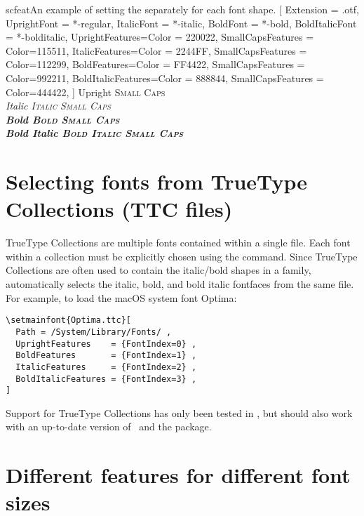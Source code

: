 \documentclass[a4paper]{l3doc}
\begin{document}
\begin{Xexample}{scfeat}{An example of setting the 
separately for each font shape.}
  [
      Extension = {.otf},
      UprightFont = {*-regular}, ItalicFont = {*-italic},
      BoldFont = {*-bold}, BoldItalicFont = {*-bolditalic},
      UprightFeatures={Color = 220022,
           SmallCapsFeatures = {Color=115511}},
       ItalicFeatures={Color = 2244FF,
           SmallCapsFeatures = {Color=112299}},
         BoldFeatures={Color = FF4422,
           SmallCapsFeatures = {Color=992211}},
   BoldItalicFeatures={Color = 888844,
           SmallCapsFeatures = {Color=444422}},
           ]
  Upright {\scshape Small Caps}\\
  \itshape Italic {\scshape Italic Small Caps}\\
  \upshape\bfseries Bold {\scshape Bold Small Caps}\\
  \itshape Bold Italic {\scshape Bold Italic Small Caps}
\end{Xexample}


\section{Selecting fonts from TrueType Collections (TTC files)}
TrueType Collections are multiple fonts contained within a single file.
Each font within a collection must be explicitly chosen using the  command.
Since TrueType Collections are often used to contain the italic/bold shapes in a family,  automatically selects the italic, bold, and bold italic fontfaces from the same file.
For example, to load the macOS system font Optima:
\begin{Verbatim}
\setmainfont{Optima.ttc}[
  Path = /System/Library/Fonts/ ,
  UprightFeatures    = {FontIndex=0} ,
  BoldFeatures       = {FontIndex=1} ,
  ItalicFeatures     = {FontIndex=2} ,
  BoldItalicFeatures = {FontIndex=3} ,
]
\end{Verbatim}
Support for TrueType Collections has only been tested in \XeTeX, but should also work with an up-to-date version of \LuaTeX\ and the  package.


\section{Different features for different font sizes}
\label{sec:sizefeature}

\end{document}
